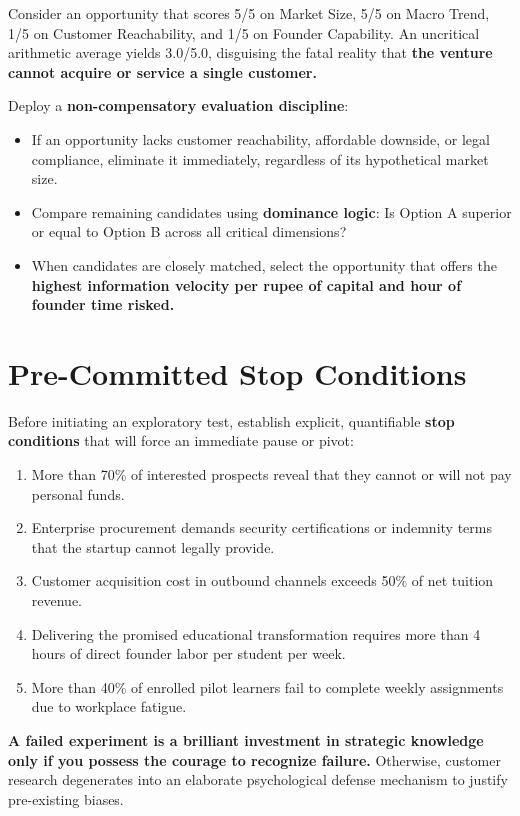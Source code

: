 Consider an opportunity that scores 5/5 on Market Size, 5/5 on Macro Trend, 1/5 on Customer Reachability, and 1/5 on Founder Capability. An uncritical arithmetic average yields 3.0/5.0, disguising the fatal reality that \textbf{the venture cannot acquire or service a single customer.}

Deploy a \textbf{non-compensatory evaluation discipline}:
\begin{itemize}[leftmargin=12pt,itemsep=1pt,topsep=1pt]
  \item If an opportunity lacks customer reachability, affordable downside, or legal compliance, eliminate it immediately, regardless of its hypothetical market size.
  \item Compare remaining candidates using \textbf{dominance logic}: Is Option A superior or equal to Option B across all critical dimensions?
  \item When candidates are closely matched, select the opportunity that offers the \textbf{highest information velocity per rupee of capital and hour of founder time risked.}
\end{itemize}

\section{Pre-Committed Stop Conditions}

Before initiating an exploratory test, establish explicit, quantifiable \textbf{stop conditions} that will force an immediate pause or pivot:
\begin{enumerate}[leftmargin=12pt,itemsep=2pt,topsep=1pt,parsep=0pt]
  \item More than 70\% of interested prospects reveal that they cannot or will not pay personal funds.
  \item Enterprise procurement demands security certifications or indemnity terms that the startup cannot legally provide.
  \item Customer acquisition cost in outbound channels exceeds 50\% of net tuition revenue.
  \item Delivering the promised educational transformation requires more than 4 hours of direct founder labor per student per week.
  \item More than 40\% of enrolled pilot learners fail to complete weekly assignments due to workplace fatigue.
\end{enumerate}

\textbf{A failed experiment is a brilliant investment in strategic knowledge only if you possess the courage to recognize failure.} Otherwise, customer research degenerates into an elaborate psychological defense mechanism to justify pre-existing biases.


